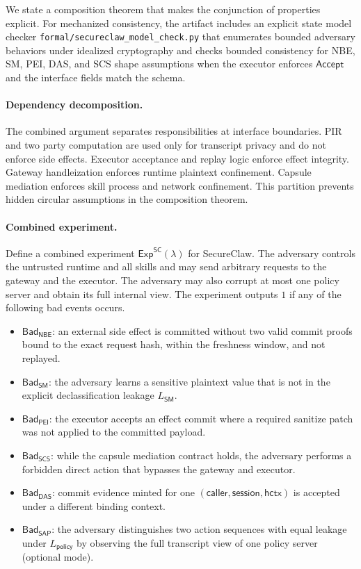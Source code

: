 We state a composition theorem that makes the conjunction of properties explicit.
For mechanized consistency, the artifact includes an explicit state model checker
\texttt{formal/secureclaw\_model\_check.py} that enumerates bounded adversary behaviors under idealized
cryptography and checks bounded consistency for NBE, SM, PEI, DAS, and SCS shape assumptions when the
executor enforces $\mathsf{Accept}$ and the interface fields match the schema.

\paragraph{Dependency decomposition.}
The combined argument separates responsibilities at interface boundaries.
PIR and two party computation are used only for transcript privacy and do not enforce side effects.
Executor acceptance and replay logic enforce effect integrity.
Gateway handleization enforces runtime plaintext confinement.
Capsule mediation enforces skill process and network confinement.
This partition prevents hidden circular assumptions in the composition theorem.

\paragraph{Combined experiment.}
Define a combined experiment $\mathsf{Exp}^{\mathsf{SC}}(\lambda)$ for SecureClaw.
The adversary controls the untrusted runtime and all skills and may send arbitrary requests to the
gateway and the executor.
The adversary may also corrupt at most one policy server and obtain its full internal view.
The experiment outputs $1$ if any of the following bad events occurs.

\begin{itemize}
\item $\mathsf{Bad}_{\mathsf{NBE}}$: an external side effect is committed without two valid commit proofs
bound to the exact request hash, within the freshness window, and not replayed.
\item $\mathsf{Bad}_{\mathsf{SM}}$: the adversary learns a sensitive plaintext value that is not in the
explicit declassification leakage $L_{\mathsf{SM}}$.
\item $\mathsf{Bad}_{\mathsf{PEI}}$: the executor accepts an effect commit where a required sanitize patch
was not applied to the committed payload.
\item $\mathsf{Bad}_{\mathsf{SCS}}$: while the capsule mediation contract holds, the adversary performs a
forbidden direct action that bypasses the gateway and executor.
\item $\mathsf{Bad}_{\mathsf{DAS}}$: commit evidence minted for one $(\mathsf{caller},\mathsf{session},\mathsf{hctx})$
is accepted under a different binding context.
\item $\mathsf{Bad}_{\mathsf{SAP}}$: the adversary distinguishes two action sequences with equal leakage
under $L_{\mathsf{policy}}$ by observing the full transcript view of one policy server (optional mode).
\end{itemize}

